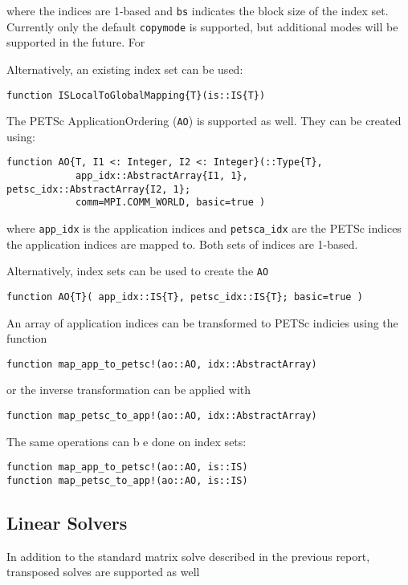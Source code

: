 \documentclass{article}
\begin{document}
\noindent where the indices are 1-based and \texttt{bs} indicates the block size of the 
index set.  Currently only the default \texttt{copymode} is supported,
but additional modes will be supported in the future.  For

Alternatively, an existing index set can be used:
\begin{verbatim}
function ISLocalToGlobalMapping{T}(is::IS{T})
\end{verbatim}

\hfill \break

The PETSc ApplicationOrdering (\texttt{AO}) is supported as well.
They can be created using:

\begin{verbatim}
function AO{T, I1 <: Integer, I2 <: Integer}(::Type{T}, 
            app_idx::AbstractArray{I1, 1}, petsc_idx::AbstractArray{I2, 1}; 
            comm=MPI.COMM_WORLD, basic=true )
\end{verbatim}

\noindent where \texttt{app\_idx} is the application indices and 
\texttt{petsca\_idx} are
the PETSc indices the application indices are mapped to.  Both sets of 
indices are 1-based.

Alternatively, index sets can be used to create the \texttt{AO}
\begin{verbatim}
function AO{T}( app_idx::IS{T}, petsc_idx::IS{T}; basic=true )
\end{verbatim}

\noindent An array of application indices can be transformed to PETSc indicies using
the function

\begin{verbatim}
function map_app_to_petsc!(ao::AO, idx::AbstractArray)
\end{verbatim}

\noindent or the inverse transformation can be applied with

\begin{verbatim}
function map_petsc_to_app!(ao::AO, idx::AbstractArray)
\end{verbatim}

\noindent The same operations can b e done on index sets:

\begin{verbatim}
function map_app_to_petsc!(ao::AO, is::IS)
function map_petsc_to_app!(ao::AO, is::IS)
\end{verbatim}



\subsection{Linear Solvers} \label{sec:ksp}
In addition to the standard matrix solve described in the previous report, 
transposed solves are supported as well
\end{document}
